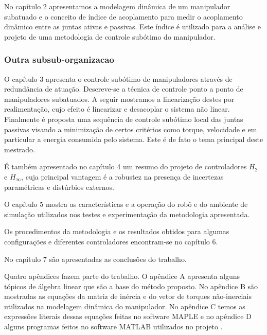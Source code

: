 No capítulo 2 apresentamos a modelagem dinâmica de um manipulador subatuado e o conceito de índice de acoplamento para medir o acoplamento dinâmico entre as juntas ativas e passivas. Este índice é utilizado para a análise e projeto de uma metodologia de controle subótimo do manipulador.

\subsubsection{Outra subsub-organizacao}

O capítulo 3 apresenta o controle subótimo de manipuladores através de redundância de atuação. Descreve-se a técnica de controle ponto a ponto de manipuladores subatuados. A seguir mostramos  a linearização destes por realimentação, cujo efeito é linearizar e desacoplar o sistema não linear. Finalmente é proposta uma sequência de controle subótimo local das juntas passivas visando a minimização de certos critérios como torque, velocidade e em particular a energia consumida pelo sistema. Este é de fato o tema principal deste mestrado.

É também apresentado no capítulo 4 um resumo do projeto de controladores  $H_{2}$ e $H_{\infty}$, cuja principal vantagem é a robustez na presença de incertezas paramétricas e distúrbios externos.

O capítulo 5 mostra as características e a operação do robô e do ambiente de simulação utilizados nos testes e experimentação da metodologia apresentada.

Os procedimentos da metodologia e os resultados obtidos para algumas configurações e diferentes controladores encontram-se no capítulo 6.

No capítulo 7 são apresentadas as conclusões do trabalho.

Quatro apêndices fazem parte do trabalho. O apêndice A apresenta alguns tópicos de álgebra linear que são a base do método proposto. No apêndice B são mostradas as equações da matriz de inércia e do vetor de torques não-inerciais
utilizados na modelagem dinâmica do manipulador. No apêndice C temos as expressões literais dessas equações feitas no software MAPLE e no apêndice D alguns programas feitos no software MATLAB utilizados no projeto \cite{Furmento1995}\cite{Morgado2003}.

